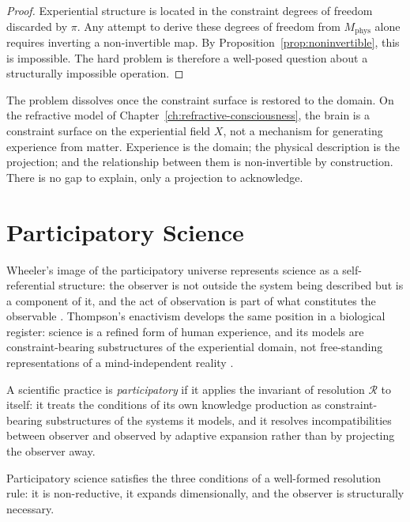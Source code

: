 \documentclass[11pt,openany]{book}
\begin{document}
\begin{proof}
Experiential structure is located in the constraint degrees
of freedom discarded by $\pi$.  Any attempt to derive these
degrees of freedom from $M_{\mathrm{phys}}$ alone requires
inverting a non-invertible map.  By
Proposition~\ref{prop:noninvertible}, this is impossible.
The hard problem is therefore a well-posed question about a
structurally impossible operation.
\end{proof}

The problem dissolves once the constraint surface is
restored to the domain.  On the refractive model of
Chapter~\ref{ch:refractive-consciousness}, the brain is a
constraint surface on the experiential field $X$, not a
mechanism for generating experience from matter.  Experience
is the domain; the physical description is the projection;
and the relationship between them is non-invertible by
construction.  There is no gap to explain, only a
projection to acknowledge.

\section{Participatory Science}
\label{sec:participatory}

Wheeler's image of the participatory universe represents
science as a self-referential structure: the observer is
not outside the system being described but is a component
of it, and the act of observation is part of what
constitutes the observable \citep{thompson2023blindspot}.
Thompson's enactivism develops the same position in a
biological register: science is a refined form of human
experience, and its models are constraint-bearing
substructures of the experiential domain, not free-standing
representations of a mind-independent reality
\citep{varela1991embodied}.

\begin{definition}
\label{def:participatory-science}
A scientific practice is \emph{participatory} if it applies
the invariant of resolution $\mathcal{R}$ to itself: it
treats the conditions of its own knowledge production as
constraint-bearing substructures of the systems it models,
and it resolves incompatibilities between observer and
observed by adaptive expansion rather than by projecting
the observer away.
\end{definition}

\begin{proposition}
\label{prop:participatory}
Participatory science satisfies the three conditions of a
well-formed resolution rule: it is non-reductive, it
expands dimensionally, and the observer is structurally
necessary.
\end{proposition}
\end{document}
